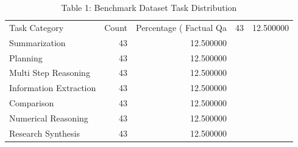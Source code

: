 \begin{table}
\caption{Table 1: Benchmark Dataset Task Distribution}
\label{tab:table1_dataset_distribution}
\begin{tabular}{lrr}
\toprule
Task Category & Count & Percentage (%
\midrule
Factual Qa & 43 & 12.500000 \\
Summarization & 43 & 12.500000 \\
Planning & 43 & 12.500000 \\
Multi Step Reasoning & 43 & 12.500000 \\
Information Extraction & 43 & 12.500000 \\
Comparison & 43 & 12.500000 \\
Numerical Reasoning & 43 & 12.500000 \\
Research Synthesis & 43 & 12.500000 \\
\bottomrule
\end{tabular}
\end{table}
